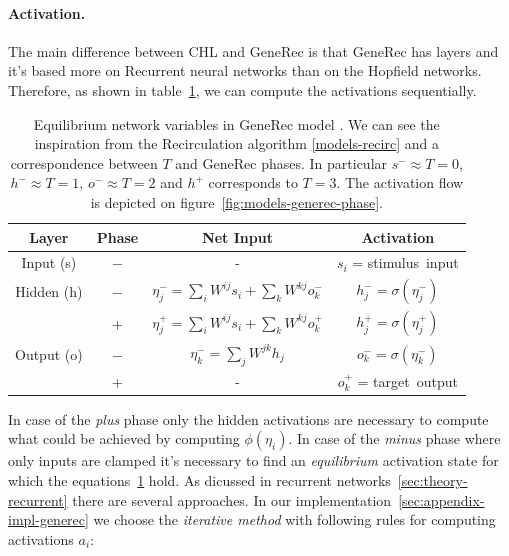 \paragraph{Activation.} 
The main difference between CHL and GeneRec is that GeneRec has layers and it's based more on Recurrent neural networks than on the Hopfield networks. Therefore, as shown in table~\ref{tab:models-generec}, we can compute the activations sequentially. 
\begin{table}
  \centering
  \begin{tabular}{|cccc|}
    \hline
    Layer & Phase & Net Input & Activation\\
    \hline
    Input (s)    & $-$ & - & $s_i$ = \mbox{stimulus input} \\
    \hline
    Hidden (h)   & $-$ & \hspace{0.3cm}$\eta^{-}_j = \sum_i W^{ij}s_i + \sum_k W^{kj}o^{-}_k$\hspace{0.3cm} &
    $h^{-}_j = \sigma(\eta^{-}_j)$\hspace{0.3cm}\\
          &  +  & $\eta^{+}_j = \sum_{i}W^{ij}s_i + \sum_k W^{kj}o^{+}_k$ & $h^{+}_{j} = \sigma(\eta^{+}_j)$ \\
    \hline
    Output (o) & $-$ & $\eta^{-}_k = \sum_j W^{jk}h_j$ & $o^{-}_k = \sigma(\eta^{-}_k)$\\
           &  +  & - & $o^{+}_k$ = \mbox{target output} \\
    \hline
  \end{tabular}
  \caption{Equilibrium network variables in GeneRec model \citet{o1996bio}. We can see the inspiration from the Recirculation algorithm \ref{models-recirc} and a correspondence between $T$ and GeneRec phases. In particular $s^{-} \approx T=0$, $h^{-} \approx T=1$, $o^{-} \approx T=2$ and $h^{+}$ corresponds to $T=3$. The activation flow is depicted on figure~\ref{fig:models-generec-phase}.}
  \label{tab:models-generec}
\end{table}
In case of the \emph{plus} phase only the hidden activations are necessary to compute what could be achieved by computing $\phi(\eta_i)$. In case of the \emph{minus} phase where only inputs are clamped it's necessary to find an \emph{equilibrium} activation state for which the equations~\ref{tab:models-generec} hold. As dicussed in recurrent networks~\ref{sec:theory-recurrent} there are several approaches. In our implementation~\ref{sec:appendix-impl-generec} we choose the \emph{iterative method} with following rules for computing activations $a_i$: 
